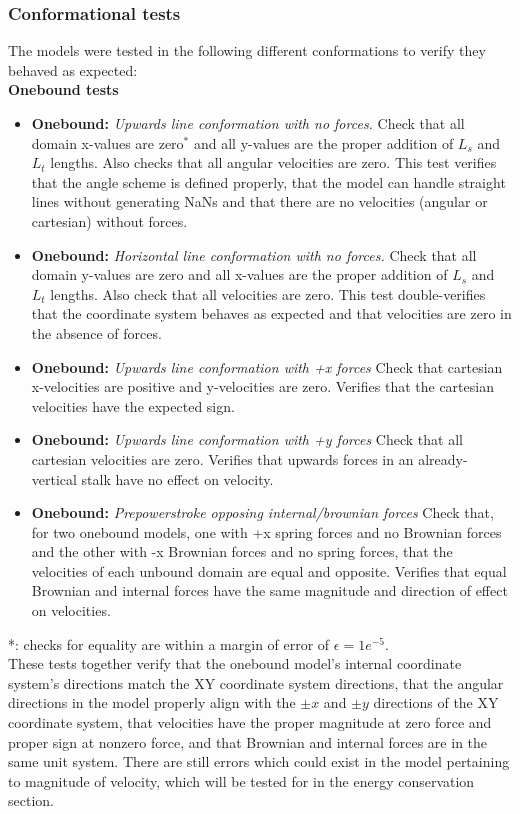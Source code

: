 \documentclass[10pt]{article} %
\begin{document}
\subsubsection{Conformational tests}
The models were tested in the following different conformations to verify they behaved as expected:\\

\textbf{Onebound tests}
\begin{itemize}
\item \textbf{Onebound:} \textit{Upwards line conformation with no forces.} Check that all domain x-values are zero$^*$ and all y-values are the proper addition of $L_s$ and $L_t$ lengths. Also checks that all angular velocities are zero. This test verifies that the angle scheme is defined properly, that the model can handle straight lines without generating NaNs and that there are no velocities (angular or cartesian) without forces.
\item \textbf{Onebound:} \textit{Horizontal line conformation with no forces.} Check that all domain y-values are zero and all x-values are the proper addition of $L_s$ and $L_t$ lengths. Also check that all velocities are zero. This test double-verifies that the coordinate system behaves as expected and that velocities are zero in the absence of forces.
\item \textbf{Onebound:} \textit{Upwards line conformation with +x forces} Check that cartesian x-velocities are positive and y-velocities are zero. Verifies that the cartesian velocities have the expected sign.
\item \textbf{Onebound:} \textit{Upwards line conformation with +y forces} Check that all cartesian velocities are zero. Verifies that upwards forces in an already-vertical stalk have no effect on velocity.
  \item \textbf{Onebound:} \textit{Prepowerstroke opposing internal/brownian forces} Check that, for two onebound models, one with +x spring forces and no Brownian forces and the other with -x Brownian forces and no spring forces, that the velocities of each unbound domain are equal and opposite. Verifies that equal Brownian and internal forces have the same magnitude and direction of effect on velocities.
\end{itemize}
*: checks for equality are within a margin of error of $\epsilon = 1e^{-5}$.\\

These tests together verify that the onebound model's internal coordinate system's directions match the XY coordinate system directions, that the angular directions in the model properly align with the $\pm x$ and $\pm y$ directions of the XY coordinate system, that velocities have the proper magnitude at zero force and proper sign at nonzero force, and that Brownian and internal forces are in the same unit system. There are still errors which could exist in the model pertaining to magnitude of velocity, which will be tested for in the energy conservation section.\\
\end{document}

